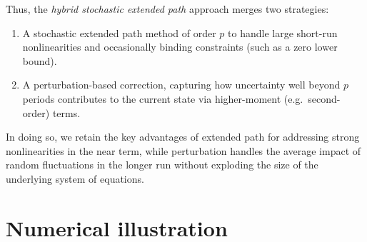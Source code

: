 \documentclass[a4paper,11pt]{amsart}
\begin{document}
Thus, the \emph{hybrid stochastic extended path} approach merges two strategies:\newline
\begin{enumerate}
   \item A stochastic extended path method of order $p$ to handle large short-run
         nonlinearities and occasionally binding constraints (such as a zero lower bound).
   \item A perturbation-based correction, capturing how uncertainty well beyond
         $p$ periods contributes to the current state via higher-moment (e.g.\ second-order)
         terms.
\end{enumerate}

In doing so, we retain the key advantages of extended path for addressing strong
nonlinearities in the near term, while perturbation handles the average impact
of random fluctuations in the longer run without exploding the size of the
underlying system of equations.

\section{Numerical illustration}\label{sec:3}
\end{document}

